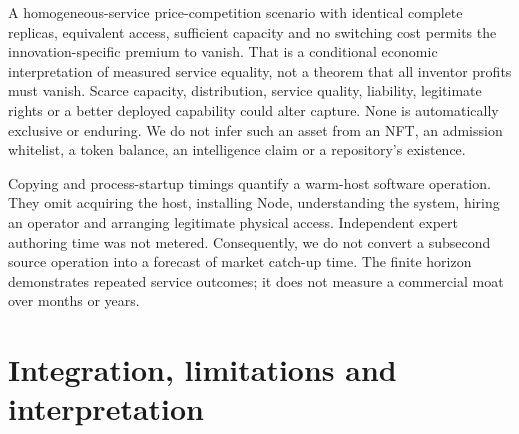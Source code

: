 A homogeneous-service price-competition scenario with identical complete replicas, equivalent access, sufficient capacity and no switching cost permits the innovation-specific premium to vanish. That is a conditional economic interpretation of measured service equality, not a theorem that all inventor profits must vanish. Scarce capacity, distribution, service quality, liability, legitimate rights or a better deployed capability could alter capture. None is automatically exclusive or enduring. We do not infer such an asset from an NFT, an admission whitelist, a token balance, an intelligence claim or a repository's existence.

Copying and process-startup timings quantify a warm-host software operation. They omit acquiring the host, installing Node, understanding the system, hiring an operator and arranging legitimate physical access. Independent expert authoring time was not metered. Consequently, we do not convert a subsecond source operation into a forecast of market catch-up time. The finite horizon demonstrates repeated service outcomes; it does not measure a commercial moat over months or years.


\clearpage
\section{Integration, limitations and interpretation}
